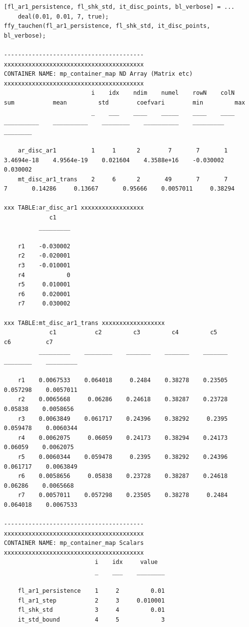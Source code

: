 \documentclass[
]{book}
\begin{document}
\begin{verbatim}
[fl_ar1_persistence, fl_shk_std, it_disc_points, bl_verbose] = ...
    deal(0.01, 0.01, 7, true);
ffy_tauchen(fl_ar1_persistence, fl_shk_std, it_disc_points, bl_verbose);

----------------------------------------
xxxxxxxxxxxxxxxxxxxxxxxxxxxxxxxxxxxxxxxx
CONTAINER NAME: mp_container_map ND Array (Matrix etc)
xxxxxxxxxxxxxxxxxxxxxxxxxxxxxxxxxxxxxxxx
                         i    idx    ndim    numel    rowN    colN       sum           mean         std        coefvari        min         max   
                         _    ___    ____    _____    ____    ____    __________    __________    ________    __________    _________    ________

    ar_disc_ar1          1     1      2        7       7       1      3.4694e-18    4.9564e-19    0.021604    4.3588e+16    -0.030002    0.030002
    mt_disc_ar1_trans    2     6      2       49       7       7               7       0.14286     0.13667       0.95666    0.0057011     0.38294

xxx TABLE:ar_disc_ar1 xxxxxxxxxxxxxxxxxx
             c1    
          _________

    r1    -0.030002
    r2    -0.020001
    r3    -0.010001
    r4            0
    r5     0.010001
    r6     0.020001
    r7     0.030002

xxx TABLE:mt_disc_ar1_trans xxxxxxxxxxxxxxxxxx
             c1           c2         c3         c4         c5          c6          c7    
          _________    ________    _______    _______    _______    ________    _________

    r1    0.0067533    0.064018     0.2484    0.38278    0.23505    0.057298    0.0057011
    r2    0.0065668     0.06286    0.24618    0.38287    0.23728     0.05838    0.0058656
    r3    0.0063849    0.061717    0.24396    0.38292     0.2395    0.059478    0.0060344
    r4    0.0062075     0.06059    0.24173    0.38294    0.24173     0.06059    0.0062075
    r5    0.0060344    0.059478     0.2395    0.38292    0.24396    0.061717    0.0063849
    r6    0.0058656     0.05838    0.23728    0.38287    0.24618     0.06286    0.0065668
    r7    0.0057011    0.057298    0.23505    0.38278     0.2484    0.064018    0.0067533

----------------------------------------
xxxxxxxxxxxxxxxxxxxxxxxxxxxxxxxxxxxxxxxx
CONTAINER NAME: mp_container_map Scalars
xxxxxxxxxxxxxxxxxxxxxxxxxxxxxxxxxxxxxxxx
                          i    idx     value  
                          _    ___    ________

    fl_ar1_persistence    1     2         0.01
    fl_ar1_step           2     3     0.010001
    fl_shk_std            3     4         0.01
    it_std_bound          4     5            3
\end{verbatim}
\end{document}
